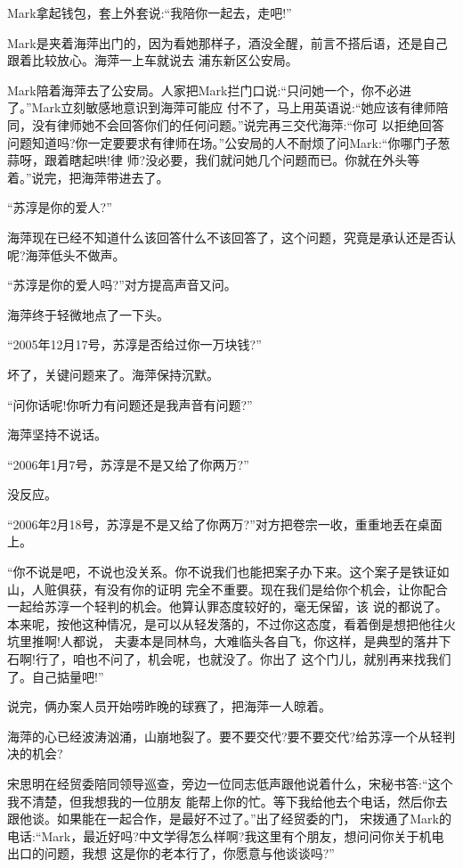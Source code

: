 \documentclass[11pt,a4paper,onecolumn]{article}
\begin{document}
Mark拿起钱包，套上外套说:``我陪你一起去，走吧!''

Mark是夹着海萍出门的，因为看她那样子，酒没全醒，前言不搭后语，还是自己跟着比较放心。海萍一上车就说去
浦东新区公安局。

Mark陪着海萍去了公安局。人家把Mark拦门口说:``只问她一个，你不必进了。''Mark立刻敏感地意识到海萍可能应
付不了，马上用英语说:``她应该有律师陪同，没有律师她不会回答你们的任何问题。''说完再三交代海萍:``你可
以拒绝回答问题知道吗?你一定要要求有律师在场。''公安局的人不耐烦了问Mark:``你哪门子葱蒜呀，跟着瞎起哄!律
师?没必要，我们就问她几个问题而已。你就在外头等着。''说完，把海萍带进去了。

``苏淳是你的爱人?''

海萍现在已经不知道什么该回答什么不该回答了，这个问题，究竟是承认还是否认呢?海萍低头不做声。

``苏淳是你的爱人吗?''对方提高声音又问。

海萍终于轻微地点了一下头。

``2005年12月17号，苏淳是否给过你一万块钱?''

坏了，关键问题来了。海萍保持沉默。

``问你话呢!你听力有问题还是我声音有问题?''

海萍坚持不说话。

``2006年1月7号，苏淳是不是又给了你两万?''

没反应。

``2006年2月18号，苏淳是不是又给了你两万?''对方把卷宗一收，重重地丢在桌面上。

``你不说是吧，不说也没关系。你不说我们也能把案子办下来。这个案子是铁证如山，人赃俱获，有没有你的证明
完全不重要。现在我们是给你个机会，让你配合一起给苏淳一个轻判的机会。他算认罪态度较好的，毫无保留，该
说的都说了。本来呢，按他这种情况，是可以从轻发落的，不过你这态度，看着倒是想把他往火坑里推啊!人都说，
夫妻本是同林鸟，大难临头各自飞，你这样，是典型的落井下石啊!行了，咱也不问了，机会呢，也就没了。你出了
这个门儿，就别再来找我们了。自己掂量吧!''

说完，俩办案人员开始唠昨晚的球赛了，把海萍一人晾着。

海萍的心已经波涛汹涌，山崩地裂了。要不要交代?要不要交代?给苏淳一个从轻判决的机会?

宋思明在经贸委陪同领导巡查，旁边一位同志低声跟他说着什么，宋秘书答:``这个我不清楚，但我想我的一位朋友
能帮上你的忙。等下我给他去个电话，然后你去跟他谈。如果能在一起合作，是最好不过了。''出了经贸委的门，
宋拨通了Mark的电话:``Mark，最近好吗?中文学得怎么样啊?我这里有个朋友，想问问你关于机电出口的问题，我想
这是你的老本行了，你愿意与他谈谈吗?''
\end{document}
